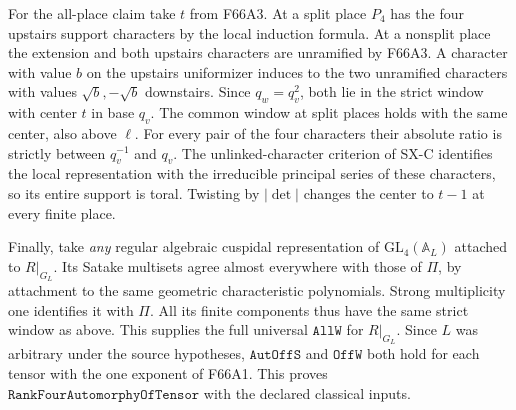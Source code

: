 For the all-place claim take $t$ from F66A3. At a split place
$P_4$ has the four upstairs support characters by the local
induction formula. At a nonsplit place the extension and both
upstairs characters are unramified by F66A3. A character with
value $b$ on the upstairs uniformizer induces to the two
unramified characters with values $\sqrt b,-\sqrt b$ downstairs.
Since $q_w=q_v^2$, both lie in the strict window with center $t$
in base $q_v$. The common window at split places holds with the
same center, also above $\ell$. For every pair of the four characters
their absolute ratio is strictly between $q_v^{-1}$ and $q_v$.
The unlinked-character criterion of SX-C identifies the local
representation with the irreducible principal series of these
characters, so its entire support is toral. Twisting by $|\det|$
changes the center to $t-1$ at every finite place.

Finally, take \emph{any} regular algebraic cuspidal representation
of $\mathrm{GL}_4(\mathbb A_L)$ attached to $R|_{G_L}$. Its Satake
multisets agree almost everywhere with those of $\Pi$, by attachment
to the same geometric characteristic polynomials. Strong multiplicity
one identifies it with $\Pi$. All its finite components thus have
the same strict window as above. This supplies the full universal
$\texttt{AllW}$ for $R|_{G_L}$. Since $L$ was arbitrary under the
source hypotheses, $\texttt{AutOffS}$ and $\texttt{OffW}$ both
hold for each tensor with the one exponent of F66A1. This proves
$\texttt{RankFourAutomorphyOfTensor}$ with the declared classical
inputs.
